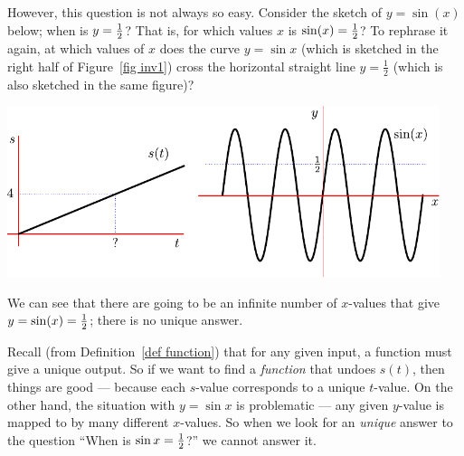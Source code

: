 However, this question is not always so easy. Consider the sketch of $y=\sin(x)$
below; when is $y=\tfrac{1}{2}$? That is, for which values $x$ is $\sin(x)=\tfrac{1}{2}$? To
rephrase it again, at which values of $x$ does the curve $y=\sin x$ (which is
sketched in the right
half of Figure~\ref{fig inv1}) cross the horizontal straight line $y=\frac{1}{2}$ (which
is also sketched in the same figure)?
\begin{fig}\label{fig inv1}
\begin{center}
 \includegraphics[height=5cm]{inv1}
\end{center}
\end{fig}
We can see that there are going to be an infinite number of $x$-values that give
$y=\sin(x)=\tfrac{1}{2}$; there is no unique answer.

Recall (from Definition~\ref{def function}) that for any given input, a function must
give a unique output. So if we want to find a \emph{function} that undoes $s(t)$, then
things are good --- because each $s$-value corresponds to a unique $t$-value. On the
other hand, the situation with $y=\sin x$ is problematic --- any given $y$-value is
mapped to by many different $x$-values. So when we look for an \emph{unique} answer to
the question ``When is $\sin x = \tfrac{1}{2}$?'' we cannot answer it.

